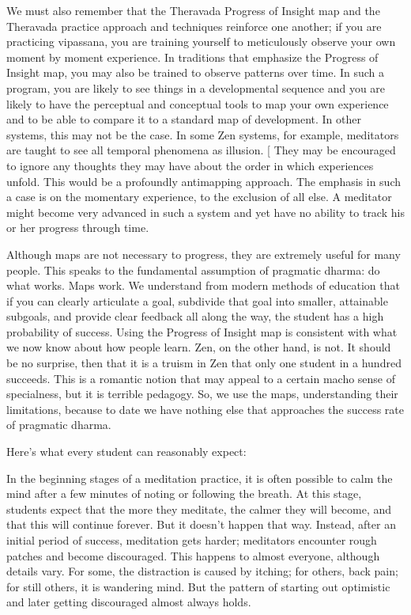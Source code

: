 \documentclass[a5paper,10pt,english]{book}
\begin{document}
\sphinxAtStartPar
We must also remember that the Theravada Progress of Insight map and the
Theravada practice approach and techniques reinforce one another; if you
are practicing vipassana, you are training yourself to meticulously
observe your own moment by moment experience. In traditions that
emphasize the Progress of Insight map, you may also be trained to
observe patterns over time. In such a program, you are likely to see
things in a developmental sequence and you are likely to have the
perceptual and conceptual tools to map your own experience and to be
able to compare it to a standard map of development. In other systems,
this may not be the case. In some Zen systems, for example, meditators
are taught to see all temporal phenomena as illusion.
{[}\sphinxurl{http://en.wikipedia.org/wiki/Makyo}{]} They may be encouraged to ignore
any thoughts they may have about the order in which experiences unfold.
This would be a profoundly anti\sphinxhyphen{}mapping approach. The emphasis in such a
case is on the momentary experience, to the exclusion of all else. A
meditator might become very advanced in such a system and yet have no
ability to track his or her progress through time.

\sphinxAtStartPar
Although maps are not necessary to progress, they are extremely useful
for many people. This speaks to the fundamental assumption of pragmatic
dharma: do what works. Maps work. We understand from modern methods of
education that if you can clearly articulate a goal, subdivide that goal
into smaller, attainable sub\sphinxhyphen{}goals, and provide clear feedback all along
the way, the student has a high probability of success. Using the
Progress of Insight map is consistent with what we now know about how
people learn. Zen, on the other hand, is not. It should be no surprise,
then that it is a truism in Zen that only one student in a hundred
succeeds. This is a romantic notion that may appeal to a certain macho
sense of specialness, but it is terrible pedagogy. So, we use the maps,
understanding their limitations, because to date we have nothing else
that approaches the success rate of pragmatic dharma.

\sphinxAtStartPar
Here’s what every student can reasonably expect:

\sphinxAtStartPar
In the beginning stages of a meditation practice, it is often possible
to calm the mind after a few minutes of noting or following the breath.
At this stage, students expect that the more they meditate, the calmer
they will become, and that this will continue forever. But it doesn’t
happen that way. Instead, after an initial period of success, meditation
gets harder; meditators encounter rough patches and become discouraged.
This happens to almost everyone, although details vary. For some, the
distraction is caused by itching; for others, back pain; for still
others, it is wandering mind. But the pattern of starting out optimistic
and later getting discouraged almost always holds.
\end{document}
